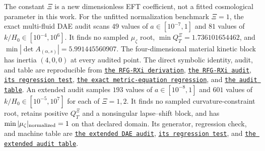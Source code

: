 \documentclass[11pt,a4paper]{article}
\newcommand{\RFGRepoURL}{https://github.com/MartinPetrasek123/MartinPetrasek123}
\newcommand{\RFGRepoNamed}[2]{\href{\RFGRepoURL/blob/main/r-universe-complete-chain/rfg-r-completion/r\_universe\_completion/#1}{\texttt{#2}}}
\begin{document}
The constant \(\Xi\) is a new dimensionless EFT coefficient, not a fitted
cosmological parameter in this work. For the unfitted normalization benchmark
\(\Xi=1\), the exact
multi-fluid DAE audit scans \(49\) values of
\(a\in[10^{-7},1]\) and \(81\) values of
\(k/H_0\in[10^{-4},10^6]\). It finds no sampled
\(\mu_\zeta\) root, \(\min Q_T^\Xi=1.736101654462\), and
\(\min|\det A_{(\alpha,s)}|=5.991445560907\). The four-dimensional material
kinetic block has inertia \((4,0,0)\) at every audited point. The direct
symbolic identity, audit, and table are reproducible from
\RFGRepoNamed{docs/rfg\_xi\_completion.md}{the RFG-RXi derivation},
\RFGRepoNamed{scripts/rfg\_xi\_completion.py}{the RFG-RXi audit},
\RFGRepoNamed{scripts/validate\_rfg\_xi\_completion.py}{its regression test},
\RFGRepoNamed{scripts/validate\_rfg\_xi\_metric\_equations.py}{the exact metric-equation regression}, and
\RFGRepoNamed{generated/tables/rfg\_xi\_completion\_audit.csv}{the audit table}.
An extended audit samples \(193\) values of
\(a\in[10^{-8},1]\) and \(601\) values of
\(k/H_0\in[10^{-5},10^7]\) for each of \(\Xi=1,2\). It finds no sampled
curvature-constraint root, retains positive \(Q_T^\Xi\) and a nonsingular
lapse--shift block, and has \(\min|\mu_\zeta|_{\rm normalized}=1\) on that
declared domain. Its generator, regression check, and machine table are
\RFGRepoNamed{scripts/rfg\_xi\_dense\_dae\_audit.py}{the extended DAE audit},
\RFGRepoNamed{scripts/validate\_rfg\_xi\_dense\_dae\_audit.py}{its regression test}, and
\RFGRepoNamed{generated/tables/rfg\_xi\_dense\_dae\_audit.csv}{the extended audit table}.
\end{document}
